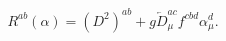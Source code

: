 \begin{equation}
R^{ab}({\alpha})=(D^2)^{ab}+g\overleftarrow{D}_\mu^{ac}f^{cbd}\alpha^d_\mu.
\end{equation}

